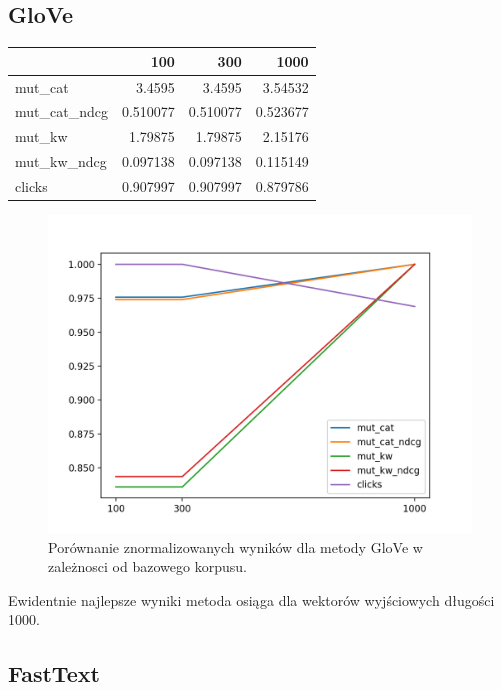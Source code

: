 \documentclass[pl]{minipw} %
\begin{document}
\subsection{GloVe}

\begin{center}
	\begin{tabular}{lrrr}
		\hline
		&      100 &      300 &     1000 \\
		\hline
		mut\_cat      & 3.4595   & 3.4595   & 3.54532  \\
		mut\_cat\_ndcg & 0.510077 & 0.510077 & 0.523677 \\
		mut\_kw       & 1.79875  & 1.79875  & 2.15176  \\
		mut\_kw\_ndcg  & 0.097138 & 0.097138 & 0.115149 \\
		clicks       & 0.907997 & 0.907997 & 0.879786 \\
		\hline
	\end{tabular}
\end{center}

\begin{figure}[H]
	\centering
	\includegraphics[width=1\textwidth]{img/results/gv_ctr.png}
	\caption{Porównanie znormalizowanych wyników dla metody GloVe w zależnosci od bazowego korpusu.}
\end{figure}

Ewidentnie najlepsze wyniki metoda osiąga dla wektorów wyjściowych długości 1000.

\subsection{FastText}
\end{document}

